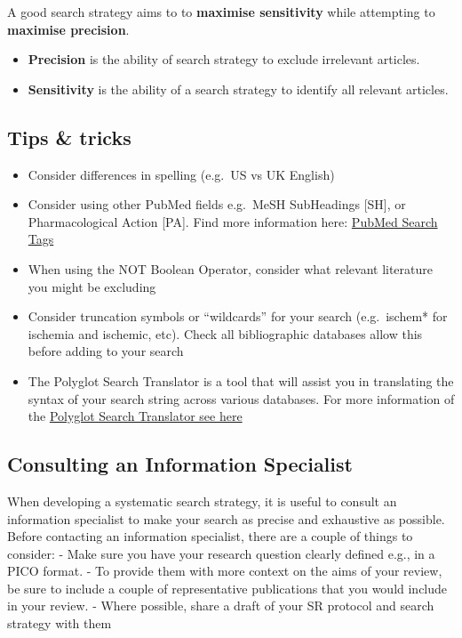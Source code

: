 \documentclass[
]{book}
\providecommand{\tightlist}{%
  \setlength{\itemsep}{0pt}\setlength{\parskip}{0pt}}
\begin{document}
A good search strategy aims to to \textbf{maximise sensitivity} while attempting to \textbf{maximise precision}.

\begin{itemize}
\tightlist
\item
  \textbf{Precision} is the ability of search strategy to exclude irrelevant articles.
\item
  \textbf{Sensitivity} is the ability of a search strategy to identify all relevant articles.
\end{itemize}

\hypertarget{tips-tricks}{%
\subsection{Tips \& tricks}\label{tips-tricks}}

\begin{itemize}
\tightlist
\item
  Consider differences in spelling (e.g.~US vs UK English)
\item
  Consider using other PubMed fields e.g.~MeSH SubHeadings {[}SH{]}, or Pharmacological Action {[}PA{]}. Find more information here: \href{https://pubmed.ncbi.nlm.nih.gov/help/\#search-tags}{PubMed Search Tags}
\item
  When using the NOT Boolean Operator, consider what relevant literature you might be excluding
\item
  Consider truncation symbols or ``wildcards'' for your search (e.g.~ischem* for ischemia and ischemic, etc). Check all bibliographic databases allow this before adding to your search
\item
  The Polyglot Search Translator is a tool that will assist you in translating the syntax of your search string across various databases. For more information of the \href{https://sr-accelerator.com/\#/polyglot}{Polyglot Search Translator see here}
\end{itemize}

\hypertarget{consulting-an-information-specialist}{%
\subsection{Consulting an Information Specialist}\label{consulting-an-information-specialist}}

When developing a systematic search strategy, it is useful to consult an information specialist to make your search as precise and exhaustive as possible. Before contacting an information specialist, there are a couple of things to consider:
- Make sure you have your research question clearly defined e.g., in a PICO format.
- To provide them with more context on the aims of your review, be sure to include a couple of representative publications that you would include in your review.
- Where possible, share a draft of your SR protocol and search strategy with them
\end{document}

